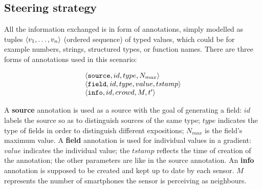 \documentclass[12pt,a4paper,twoside,openright]{book}
\begin{document}
\subsection{Steering strategy}

All the information exchanged is in form of annotations, simply modelled as tuples $\langle v_1,\ldots,v_n\rangle$ (ordered sequence) of typed values, which could be for example numbers, strings, structured types, or function names.
%
\noindent There are three forms of annotations used in this scenario:

{\[\begin{array}{l}
 \langle \mathtt{source}, id, type, N_{max}\rangle \\
 \langle \mathtt{field}, id, type, value, tstamp\rangle \\
\langle \mathtt{info}, id, crowd, M, t'\rangle \\
\end{array}\]}

\noindent A \textbf{source} annotation is used as a source with the goal of generating a field: $id$ labels the source so as to distinguish sources of the same type; $type$ indicates the type of fields in order to distinguish different expositions; $N_{max}$ is the field's maximum value. 
%
A \textbf{field} annotation is used for individual values in a gradient: $value$ indicates the individual value; the $tstamp$ reflects the time of creation of the annotation; the other parameters are like in the source annotation.
%
An \textbf{info} annotation is supposed to be created and kept up to date by each sensor. $M$ represents the number of smartphones the sensor is perceiving as neighbours.
\end{document}
